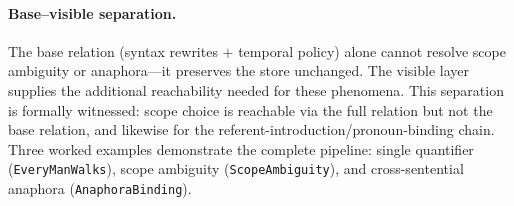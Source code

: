 \documentclass[11pt]{article}
\newcommand{\code}[1]{\texttt{#1}}
\begin{document}
\paragraph{Base--visible separation.}
The base relation (syntax rewrites $+$ temporal policy) alone cannot
resolve scope ambiguity or anaphora---it preserves the store unchanged.
The visible layer supplies the additional reachability needed for these
phenomena.  This separation is formally witnessed: scope choice is
reachable via the full relation but not the base relation, and likewise
for the referent-introduction/pronoun-binding chain.  Three worked
examples demonstrate the complete pipeline: single quantifier
(\code{EveryManWalks}), scope ambiguity (\code{ScopeAmbiguity}),
and cross-sentential anaphora (\code{AnaphoraBinding}).
\end{document}
